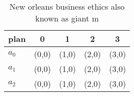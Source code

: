 \documentclass[a4paper]{article}
\begin{document}
\begin{table}
\begin{adjustbox}{width=0.6\columnwidth}
\begin{tabular}{|l|l|l|l|l|}
\hline
\textbf{plan} & \multicolumn{1}{c|}{\textbf{0}} & \multicolumn{1}{c|}{\textbf{1}} & \multicolumn{1}{c|}{\textbf{2}} & \multicolumn{1}{c|}{\textbf{3}} \\ \hline
\textbf{$a_0$}  & (0,0) & (1,0) & (2,0) & (3,0) \\ \hline
\textbf{$a_1$}  & (0,0) & (1,0) & (2,0) & (3,0) \\ \hline
\textbf{$a_2$}  & (0,0) & (1,0) & (2,0) & (3,0) \\ \hline
\end{tabular}
\end{adjustbox}
\caption{New orleans business ethics also known as giant m
}
\end{table}
\end{document}
